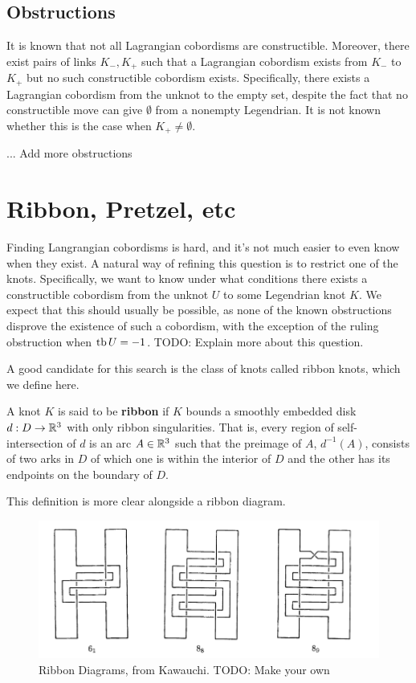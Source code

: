 \subsection{Obstructions}

It is known that not all Lagrangian cobordisms are constructible. Moreover, there exist pairs of links $K_-, K_+$ such that a Lagrangian cobordism exists from $K_-$ to $K_+$ but no such constructible cobordism exists. Specifically, there exists a Lagrangian cobordism from the unknot to the empty set, despite the fact that no constructible move can give $\emptyset$ from a nonempty Legendrian. It is not known whether this is the case when $K_+ \neq \emptyset$.

... Add more obstructions

\section{Ribbon, Pretzel, etc}

Finding Langrangian cobordisms is hard, and it's not much easier to even know when they exist.
A natural way of refining this question is to restrict one of the knots.
Specifically, we want to know under what conditions there exists a constructible cobordism from the unknot $U$ to some Legendrian knot $K$. We expect that this should usually be possible, as none of the known obstructions disprove the existence of such a cobordism, with the exception of the ruling obstruction when $\operatorname{tb} U = -1$. TODO: Explain more about this question.

A good candidate for this search is the class of knots called ribbon knots, which we define here.

\begin{definition}
    A knot $K$ is said to be \textbf{ribbon} if $K$ bounds a smoothly embedded disk $d: D \to \mathbb{R}^3$ with only ribbon singularities.
    That is, every region of self-intersection of $d$ is an arc $A \in \mathbb{R}^3$ such that the preimage of $A$, $d^{-1} (A)$, consists of two arks in $D$ of which one is within the interior of $D$ and the other has its endpoints on the boundary of $D$.
\end{definition}

This definition is more clear alongside a ribbon diagram.

\begin{figure}[ht!]
    \centering
    \includegraphics[width=0.8\linewidth]{images/ribbon-knots-kawauchi.png}
    \caption{Ribbon Diagrams, from Kawauchi. TODO: Make your own}%
    \label{fig:ribbon-knots-kawauchi}
\end{figure}
